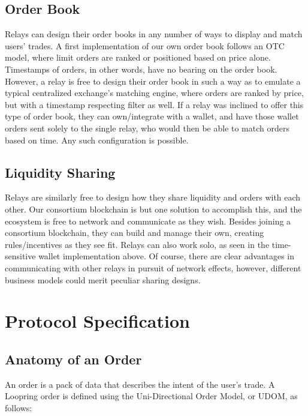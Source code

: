 \documentclass[UTF8,nofonts]{article}
\begin{document}
\begin{multicols}{2}
\subsection{Order Book\label{sec:order_book}}
Relays can design their order books in any number of ways to display and match users' trades. A first implementation of our own order book follows an OTC model, where limit orders are ranked or positioned based on price alone. Timestamps of orders, in other words, have no bearing on the order book. However, a relay is free to design their order book in such a way as to emulate a typical centralized exchange's matching engine, where orders are ranked by price, but with a timestamp respecting filter as well. If a relay was inclined to offer this type of order book, they can own/integrate with a wallet, and have those wallet orders sent solely to the single relay, who would then be able to match orders based on time. Any such configuration is possible. 

\subsection{Liquidity Sharing\label{sec:liquidity_sharing}}
Relays are similarly free to design how they share liquidity and orders with each other. Our consortium blockchain is but one solution to accomplish this, and the ecosystem is free to network and communicate as they wish. Besides joining a consortium blockchain, they can build and manage their own, creating rules/incentives as they see fit. Relays can also work solo, as seen in the time-sensitive wallet implementation above. Of course, there are clear advantages in communicating with other relays in pursuit of network effects, however, different business models could merit peculiar sharing designs. 


\section{Protocol Specification\label{sec:protocol}}

\subsection{Anatomy of an Order\label{anatomy}}
An order is a pack of data that describes the intent of the user's trade. A Loopring order is defined using the Uni-Directional Order Model, or UDOM, as follows:


\end{multicols}
\end{document}
